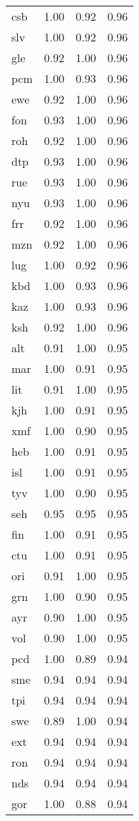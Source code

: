 \begin{table}
\begin{tabular}{lrrr}
csb & 1.00 & 0.92 & 0.96 \\
slv & 1.00 & 0.92 & 0.96 \\
gle & 0.92 & 1.00 & 0.96 \\
pcm & 1.00 & 0.93 & 0.96 \\
ewe & 0.92 & 1.00 & 0.96 \\
fon & 0.93 & 1.00 & 0.96 \\
roh & 0.92 & 1.00 & 0.96 \\
dtp & 0.93 & 1.00 & 0.96 \\
rue & 0.93 & 1.00 & 0.96 \\
nyu & 0.93 & 1.00 & 0.96 \\
frr & 0.92 & 1.00 & 0.96 \\
mzn & 0.92 & 1.00 & 0.96 \\
lug & 1.00 & 0.92 & 0.96 \\
kbd & 1.00 & 0.93 & 0.96 \\
kaz & 1.00 & 0.93 & 0.96 \\
ksh & 0.92 & 1.00 & 0.96 \\
alt & 0.91 & 1.00 & 0.95 \\
mar & 1.00 & 0.91 & 0.95 \\
lit & 0.91 & 1.00 & 0.95 \\
kjh & 1.00 & 0.91 & 0.95 \\
xmf & 1.00 & 0.90 & 0.95 \\
heb & 1.00 & 0.91 & 0.95 \\
isl & 1.00 & 0.91 & 0.95 \\
tyv & 1.00 & 0.90 & 0.95 \\
seh & 0.95 & 0.95 & 0.95 \\
fin & 1.00 & 0.91 & 0.95 \\
ctu & 1.00 & 0.91 & 0.95 \\
ori & 0.91 & 1.00 & 0.95 \\
grn & 1.00 & 0.90 & 0.95 \\
ayr & 0.90 & 1.00 & 0.95 \\
vol & 0.90 & 1.00 & 0.95 \\
pcd & 1.00 & 0.89 & 0.94 \\
sme & 0.94 & 0.94 & 0.94 \\
tpi & 0.94 & 0.94 & 0.94 \\
swe & 0.89 & 1.00 & 0.94 \\
ext & 0.94 & 0.94 & 0.94 \\
ron & 0.94 & 0.94 & 0.94 \\
nds & 0.94 & 0.94 & 0.94 \\
gor & 1.00 & 0.88 & 0.94 \\

\end{tabular}
\end{table}
